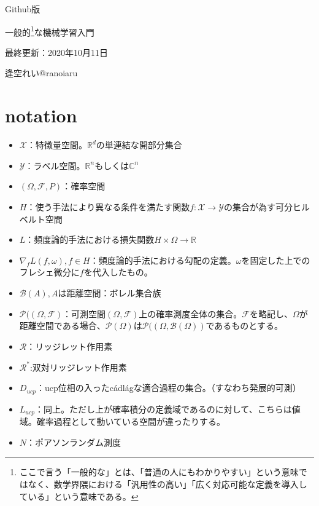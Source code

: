 \documentclass{jsarticle}
\begin{document}
\begin{center}
  
  \Huge Github版 \par
  \vspace{15mm}
  \Huge 一般的\footnote{ここで言う「一般的な」とは、「普通の人にもわかりやすい」という意味ではなく、数学界隈における「汎用性の高い」「広く対応可能な定義を導入している」という意味である。}な機械学習入門\par
  \vspace{90mm}
  \Large 最終更新：2020年10月11日 \par
  \Large 逢空れい@ranoiaru\par

\end{center}
\thispagestyle{empty}
\clearpage
\addtocounter{page}{-1}







\newpage


 \tableofcontents
 \clearpage
\section*{notation}
\begin{itemize}
\item $\mathcal{X}$：特徴量空間。$\mathbb{R}^d$の単連結な開部分集合
\item $\mathcal{Y}$：ラベル空間。$\mathbb{R}^n$もしくは$\mathbb{C}^n$
\item $(\Omega,\mathcal{F},P)$：確率空間
\item $H$：使う手法により異なる条件を満たす関数$f:\mathcal{X}\to\mathcal{Y}$の集合が為す可分ヒルベルト空間
\item $L$：頻度論的手法における損失関数$H\times\Omega \to \mathbb{R}$
\item $\nabla_f L(f,\omega),f\in H$：頻度論的手法における勾配の定義。$\omega$を固定した上でのフレシェ微分に$f$を代入したもの。
\item $\mathcal{B}(A),A$は距離空間：ボレル集合族
\item $\mathcal{P}((\Omega,\mathcal{F})$：可測空間$(\Omega,\mathcal{F})$上の確率測度全体の集合。$\mathcal{F}$を略記し、$\Omega$が距離空間である場合、$\mathcal{P}(\Omega)$は$\mathcal{P}((\Omega,\mathcal{B}(\Omega))$であるものとする。
\item $\mathcal{R}$：リッジレット作用素
\item $\mathcal{R}^*$:双対リッジレット作用素
\item $D_{ucp}$：ucp位相の入ったc\'{a}dl\'{a}gな適合過程の集合。（すなわち発展的可測）
\item $L_{ucp}$：同上。ただし上が確率積分の定義域であるのに対して、こちらは値域。確率過程として動いている空間が違ったりする。
\item $N$：ポアソンランダム測度
\end{itemize}
\end{document}

